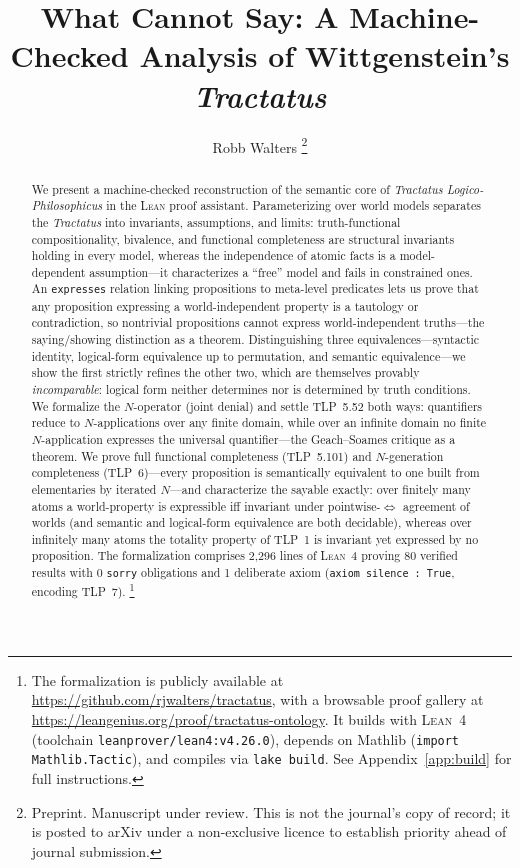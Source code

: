 \documentclass[jsl,bibother]{asl}
\title[What Lean Cannot Say]{What \Lean{} Cannot Say:
A Machine-Checked Analysis of Wittgenstein's \emph{Tractatus}}
\author{Robb Walters%
\footnote{Preprint. Manuscript under review. This is not the journal's
  copy of record; it is posted to arXiv under a non-exclusive licence
  to establish priority ahead of journal submission.}}
\theoremstyle{definition}
\theoremstyle{remark}
\newcommand{\Lean}{\textsc{Lean}}
\begin{document}
\begin{abstract}
We present a machine-checked reconstruction of the semantic core
of \emph{Tractatus Logico-Philosophicus} in the \Lean{} proof
assistant.  Parameterizing over world models separates the
\emph{Tractatus} into invariants, assumptions, and limits:
truth-functional compositionality, bivalence, and functional
completeness are structural invariants holding in every model,
whereas the independence of atomic facts is a model-dependent
assumption---it characterizes a ``free'' model and fails in
constrained ones.  An \texttt{expresses} relation linking
propositions to meta-level predicates lets us prove that any
proposition expressing a world-independent property is a
tautology or contradiction, so nontrivial propositions cannot
express world-independent truths---the saying/showing distinction
as a theorem.  Distinguishing three equivalences---syntactic
identity, logical-form equivalence up to permutation, and
semantic equivalence---we show the first strictly refines the
other two, which are themselves provably \emph{incomparable}:
logical form neither determines nor is determined by truth
conditions.  We formalize the $N$-operator (joint denial) and
settle TLP~5.52 both ways: quantifiers reduce to $N$-applications
over any finite domain, while over an infinite domain no finite
$N$-application expresses the universal quantifier---the
Geach--Soames critique as a theorem.  We prove full functional
completeness (TLP~5.101) and $N$-generation completeness
(TLP~6)---every proposition is semantically equivalent to one
built from elementaries by iterated $N$---and characterize the
sayable exactly: over finitely many atoms a world-property is
expressible iff invariant under pointwise-$\iff$ agreement of
worlds (and semantic and logical-form equivalence are both
decidable), whereas over infinitely many atoms the totality
property of TLP~1 is invariant yet expressed by no proposition.
The formalization comprises 2,296 lines of \Lean~4 proving 80
verified results with 0 \texttt{sorry} obligations and 1
deliberate axiom (\texttt{axiom silence : True}, encoding
TLP~7).%
\footnote{The formalization is publicly available at
  \url{https://github.com/rjwalters/tractatus},
  with a browsable proof gallery at
  \url{https://leangenius.org/proof/tractatus-ontology}.
  It builds with \Lean~4 (toolchain \texttt{leanprover/lean4:v4.26.0}),
  depends on Mathlib (\texttt{import Mathlib.Tactic}), and compiles via
  \texttt{lake build}.  See Appendix~\ref{app:build} for full
  instructions.}
\end{abstract}
\end{document}
